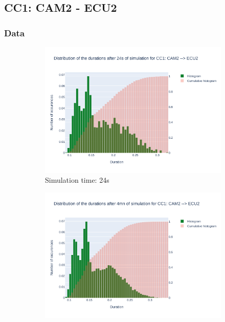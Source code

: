 \documentclass{article}
\begin{document}
\subsection{CC1: CAM2 - ECU2}
\subsubsection{Data}

\begin{figure}[H]
    \centering
    \begin{subfigure}{.495\textwidth}
        \centering
        \includegraphics[width=\textwidth]{../fig/data/CC1: CAM2 --> ECU2_24s.png}
        \caption{Simulation time: 24s}
        \vspace{.5cm}
    \end{subfigure}
    \begin{subfigure}{.495\textwidth}
        \centering
        \includegraphics[width=\textwidth]{../fig/data/CC1: CAM2 --> ECU2_4mn.png}

\end{subfigure}
\end{figure}
\end{document}
